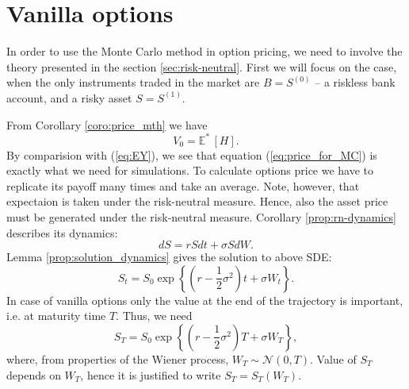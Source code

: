\documentclass[a4paper,12pt, oneside]{book}
\theoremstyle{definition}
\theoremstyle{remark}
\def\Em{{\mathbb{E}^*}\,}
\begin{document}
\section{Vanilla options}
\label{sec:pricing_vanilla}

In order to use the Monte Carlo method in option pricing, we need to involve the theory presented in the section \ref{sec:risk-neutral}. First we will focus on the case, when the only instruments traded in the market are $B = S^{(0)}$ -- a riskless bank account, and a risky asset $S = S^{(1)}$.

From Corollary \ref{coro:price_mth} we have
\begin{equation}
 \label{eq:price_for_MC}
 V_0 = \Em[H].%
\end{equation}
By comparision with (\ref{eq:EY}), we see that equation (\ref{eq:price_for_MC}) is exactly what we need for simulations. To calculate options price we have to replicate its payoff many times and take an average. Note, however, that expectaion is taken under the risk-neutral measure. Hence, also the asset price must be generated under the risk-neutral measure. Corollary \ref{prop:rn-dynamics} describes its dynamics:
\[ dS = rSdt + \sigma S dW. \]
Lemma \ref{prop:solution_dynamics} gives the solution to above SDE:
\begin{equation}
 \label{eq:vanilla_St}
 S_t = S_0 \exp\left\{ (r - \frac{1}{2}\sigma^2)t + \sigma W_t \right\}.
\end{equation}
In case of vanilla options only the value at the end of the trajectory is important, i.e. at maturity time $T$. Thus, we need
\begin{equation}
\label{eq:vanilla_ST}
 S_T = S_0 \exp\left\{ (r - \frac{1}{2}\sigma^2)T + \sigma W_T \right\},
\end{equation}
where, from properties of the Wiener process, $W_T \sim \mathcal{N}(0,T)$. Value of $S_T$ depends on $W_T$, hence it is justified to write $S_T = S_T(W_T)$.
\end{document}
